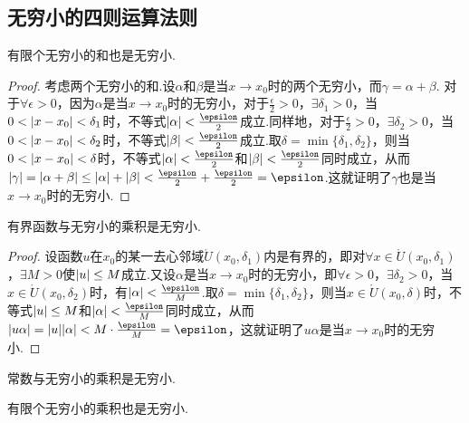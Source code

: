 \subsection{无穷小的四则运算法则}
\begin{theorem}
有限个无穷小的和也是无穷小.
\begin{proof}
考虑两个无穷小的和.设\(\alpha\)和\(\beta\)是当\(x \to x_0\)时的两个无穷小，而\(\gamma = \alpha+\beta\).
对于\(\forall\epsilon>0\)，因为\(\alpha\)是当\(x \to x_0\)时的无穷小，对于\(\frac{\epsilon}{2}>0\)，\(\exists \delta_1 > 0\)，当\(0<\abs{x-x_0}<\delta_1\)时，不等式\(\abs{\alpha}<\frac{\epsilon}{2}\)成立.同样地，对于\(\frac{\epsilon}{2}>0\)，\(\exists \delta_2 > 0\)，当\(0<\abs{x-x_0}<\delta_2\)时，不等式\(\abs{\beta}<\frac{\epsilon}{2}\)成立.取\(\delta=\min\{\delta_1,\delta_2\}\)，则当\(0<\abs{x-x_0}<\delta\)时，不等式\(\abs{\alpha}<\frac{\epsilon}{2}\)和\(\abs{\beta}<\frac{\epsilon}{2}\)同时成立，从而\(\abs{\gamma}=\abs{\alpha+\beta}\leq\abs{\alpha}+\abs{\beta}<\frac{\epsilon}{2}+\frac{\epsilon}{2}=\epsilon\).这就证明了\(\gamma\)也是当\(x \to x_0\)时的无穷小.
\end{proof}
\end{theorem}

\begin{theorem}
有界函数与无穷小的乘积是无穷小.
\begin{proof}
设函数\(u\)在\(x_0\)的某一去心邻域\(\mathring{U}(x_0,\delta_1)\)内是有界的，即对\(\forall x\in\mathring{U}(x_0,\delta_1)\)，\(\exists M>0\)使\(\abs{u} \leq M\)成立.又设\(\alpha\)是当\(x \to x_0\)时的无穷小，即\(\forall \epsilon > 0\)，\(\exists \delta_2 > 0\)，当\(x\in\mathring{U}(x_0,\delta_2)\)时，有\(\abs{\alpha}<\frac{\epsilon}{M}\).取\(\delta=\min\{\delta_1,\delta_2\}\)，则当\(x\in\mathring{U}(x_0,\delta)\)时，不等式\(\abs{u} \leq M\)和\(\abs{\alpha} < \frac{\epsilon}{M}\)同时成立，从而\(\abs{u \alpha} = \abs{u}\abs{\alpha} < M \cdot \frac{\epsilon}{M} = \epsilon\)，这就证明了\(u \alpha\)是当\(x \to x_0\)时的无穷小.
\end{proof}
\end{theorem}

\begin{corollary}
常数与无穷小的乘积是无穷小.
\end{corollary}

\begin{corollary}
有限个无穷小的乘积也是无穷小.
\end{corollary}

